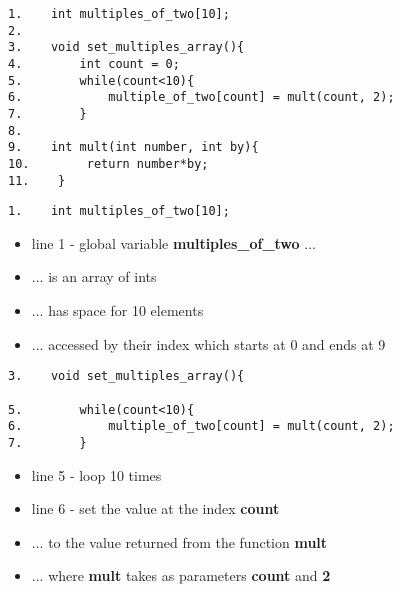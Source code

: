 \documentclass{beamer}
\begin{document}
\begin{frame}[fragile]
\begin{block}{}
\begin{lstlisting}
1.    int multiples_of_two[10];
2.     
3.    void set_multiples_array(){
4.        int count = 0;
5.        while(count<10){
6.            multiple_of_two[count] = mult(count, 2);
7.        }
8.
9.    int mult(int number, int by){
10.        return number*by;
11.    }
\end{lstlisting}
\end{block}
\end{frame}

\begin{frame}[fragile]
\begin{block}{}
\begin{lstlisting}
1.    int multiples_of_two[10];
\end{lstlisting}
\end{block}
\begin{itemize}
\item line 1 - global variable \textbf{multiples\_of\_two} ...
\item ... is an array of ints 
\item ... has space for 10 elements
\item ... accessed by their index which starts at 0 and ends at 9
\end{itemize}
\end{frame}

\begin{frame}[fragile]
\begin{block}{}
\begin{lstlisting}
3.    void set_multiples_array(){

5.        while(count<10){
6.            multiple_of_two[count] = mult(count, 2);
7.        }
\end{lstlisting}
\end{block}
\begin{itemize}
\item line 5 - loop 10 times
\item line 6 - set the value at the index \textbf{count}
\item ... to the value returned from the function \textbf{mult}
\item ... where \textbf{mult} takes as parameters \textbf{count} and \textbf{2}
\end{itemize}
\end{frame}
\end{document}
